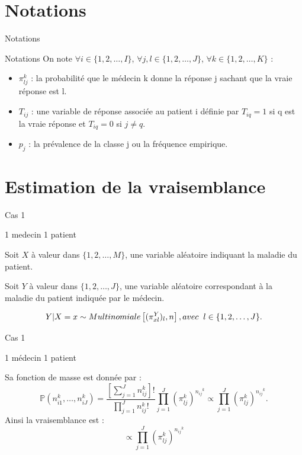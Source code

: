 \documentclass[11pt]{beamer}
\begin{document}
	
	\section{Notations}
	\begin{frame}{Notations}
		\begin{block}{Notations}
			On note $\forall i \in \{1, 2, \dots,I\}$, $\forall j, l \in \{1, 2, \dots,J\}$, $\forall k \in \{1, 2, \dots,K\}$ : \\
			\begin{itemize}
				\item $\pi_{lj}^k$ : la probabilité que le médecin k donne la réponse j sachant que la vraie réponse est l.
				\item $T_{ij}$ : une variable de réponse associée au patient i définie par $T_{iq} = 1$  si q est la vraie réponse et $T_{iq} = 0$ si $j \neq q$.
				\item $p_j$ : la prévalence de la classe j ou la fréquence empirique.
				
			\end{itemize} 
			
		\end{block}
	\end{frame}
	
	\section{Estimation de la vraisemblance}
	\begin{frame}{Cas 1}
		\begin{block}{1 medecin 1 patient}	
			
			Soit $X$ à valeur dans $\{1, 2, \dots ,M\}$, une variable aléatoire indiquant la maladie du patient.
			
			Soit $Y$ à valeur dans $\{1, 2, \dots ,J\}$, une variable aléatoire correspondant à la maladie du patient indiquée par le médecin.																												
			
			\[Y | X=x \sim Multinomiale \left[(\pi_{xl}^Y)_{l}, n\right], avec\hspace{2mm}l \in \{1, 2, \dots,J\} .\]
		\end{block}
	\end{frame}
	
	
	\begin{frame}{Cas 1}
		\begin{block}{1 médecin 1 patient}	
			
			Sa fonction de masse est donnée par : \[\mathbb{P}\left(n_{i1}^k, \dots, n_{iJ}^k\right) = \frac{\left[\sum_{j=1}^{J} n_{ij}^k\right]!}{\prod_{j=1}^{J} n_{ij}^k !} \prod_{j=1}^{J} \left(\pi_{lj}^k\right)^{{n_{ij}}^{k}} \propto \prod_{j=1}^{J} \left(\pi_{lj}^k\right)^{{n_{ij}}^{k}}.\]
			Ainsi la vraisemblance est : \[\propto \prod_{j=1}^{J} \left(\pi_{lj}^k\right)^{{n_{ij}}^{k}}\]
			
		\end{block}
	\end{frame}
	
\end{document}
